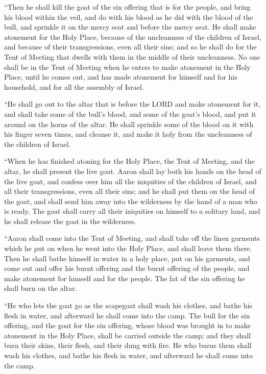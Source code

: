  ``Then he shall kill the goat of the sin offering that
is for the people, and bring his blood within the veil, and do with his
blood as he did with the blood of the bull, and sprinkle it on the mercy
seat and before the mercy seat.  He shall make atonement
for the Holy Place, because of the uncleanness of the children of
Israel, and because of their transgressions, even all their sins; and so
he shall do for the Tent of Meeting that dwells with them in the middle
of their uncleanness.  No one shall be in the Tent of
Meeting when he enters to make atonement in the Holy Place, until he
comes out, and has made atonement for himself and for his household, and
for all the assembly of Israel.

 ``He shall go out to the altar that is before the LORD
and make atonement for it, and shall take some of the bull's blood, and
some of the goat's blood, and put it around on the horns of the altar.
 He shall sprinkle some of the blood on it with his
finger seven times, and cleanse it, and make it holy from the
uncleanness of the children of Israel.

 ``When he has finished atoning for the Holy Place, the
Tent of Meeting, and the altar, he shall present the live goat.
 Aaron shall lay both his hands on the head of the live
goat, and confess over him all the iniquities of the children of Israel,
and all their transgressions, even all their sins; and he shall put them
on the head of the goat, and shall send him away into the wilderness by
the hand of a man who is ready.  The goat shall carry all
their iniquities on himself to a solitary land, and he shall release the
goat in the wilderness.

 ``Aaron shall come into the Tent of Meeting, and shall
take off the linen garments which he put on when he went into the Holy
Place, and shall leave them there.  Then he shall bathe
himself in water in a holy place, put on his garments, and come out and
offer his burnt offering and the burnt offering of the people, and make
atonement for himself and for the people.  The fat of the
sin offering he shall burn on the altar.

 ``He who lets the goat go as the scapegoat shall wash
his clothes, and bathe his flesh in water, and afterward he shall come
into the camp.  The bull for the sin offering, and the
goat for the sin offering, whose blood was brought in to make atonement
in the Holy Place, shall be carried outside the camp; and they shall
burn their skins, their flesh, and their dung with fire. 
He who burns them shall wash his clothes, and bathe his flesh in water,
and afterward he shall come into the camp.

